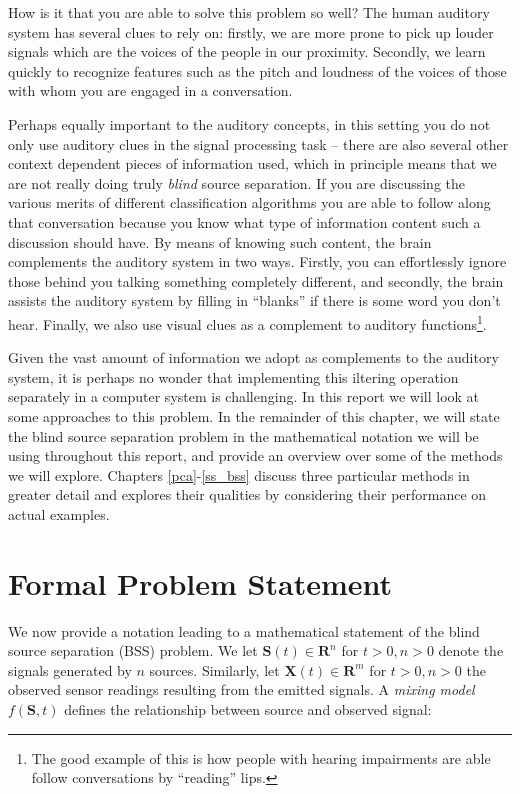 \documentclass[11pt, oneside, a4paper]{report}
\begin{document}
How is it that you are able to solve this problem so well? The human
auditory system has several clues to rely on: firstly, we are more
prone to pick up louder signals which are the voices of the people in
our proximity. Secondly, we learn quickly to recognize features such
as the pitch and loudness of the voices of those with whom you
are engaged in a conversation.

Perhaps equally important to the auditory concepts, in this setting you do not only use auditory clues in the
signal processing task -- there are also several other context
dependent pieces of information used, which in principle means that we
are not really doing truly \emph{blind} source separation. If you are discussing the various merits of
different classification algorithms you are able to follow along that
conversation because you know what type of information content such a
discussion should have. By  means of knowing such content, the brain
complements the auditory system in two ways. Firstly, you
can effortlessly ignore those behind you talking something completely
different, and secondly, the brain assists the
auditory system by filling in ``blanks'' if there is some word you
don't hear. Finally, we also use visual clues as a complement to
auditory functions\footnote{The good example of this is how people
 with hearing impairments are able follow conversations by ``reading'' lips.}. 

Given the vast amount of information we adopt as complements to the auditory system, 
it is perhaps no wonder that implementing this
iltering operation separately in a computer system is challenging. In
this report we will look at some approaches to this problem. In the
remainder of this chapter, we will state the blind source separation
problem in the mathematical notation we will be using throughout this
report, and provide an overview over some of the methods we will
explore. Chapters \ref{pca}-\ref{ss_bss} discuss three particular
methods in greater detail and explores their qualities by considering
their performance on actual examples.


\section{Formal Problem Statement}

We now provide a notation leading to a mathematical statement of the
blind source separation (BSS) problem. We let $\boldsymbol{S}(t)\in
\mathbf{R}^n$ for $t>0, n>0$ denote the signals generated by $n$
sources. Similarly, let $\boldsymbol{X}(t)\in \mathbf{R}^m$ for $t>0,
n>0$ the observed sensor readings resulting from the emitted
signals. A \emph{mixing model} $f(\boldsymbol{S},t)$ defines the
relationship between source and observed signal:
\end{document}
